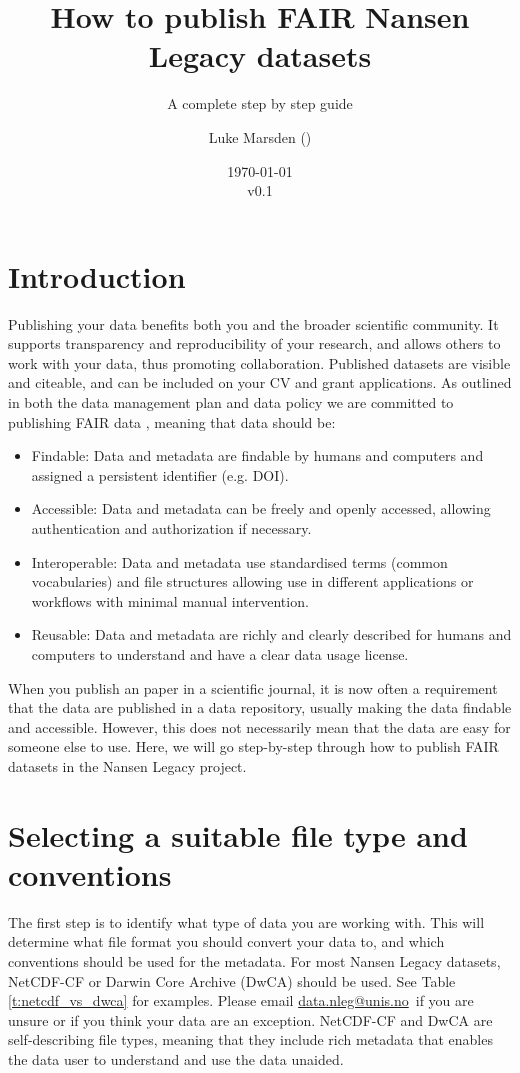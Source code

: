 \documentclass[a4paper,english, 11pt]{article}
\title{How to publish FAIR Nansen Legacy datasets}
\subtitle{A complete step by step guide}
\date{\today\\v0.1}
\author{Luke Marsden (\emailme)}
\makeatletter
\newcommand{\emailme}{\href{mailto:data.nleg@unis.no}{data.nleg@unis.no}}
\makeatother
\begin{document}
\maketitle
\tableofcontents
\pagestyle{fancy}
\newpage
\section{Introduction}
\label{s:Introduction}

Publishing your data benefits both you and the broader scientific community. It supports transparency and reproducibility of your research, and allows others to work with your data, thus promoting collaboration. Published datasets are visible and citeable, and can be included on your CV and grant applications. As outlined in both the data management plan \citep{aendmp2021} and data policy \citep{aendatapolicy2021} we are committed to publishing FAIR data \citep{wilkinson2016fair}, meaning that data should be:

\begin{itemize}
\item Findable: Data and metadata are findable by humans and computers and assigned a persistent identifier (e.g. DOI).
\item Accessible: Data and metadata can be freely and openly accessed, allowing authentication and authorization if necessary.
\item Interoperable: Data and metadata use standardised terms (common vocabularies) and file structures allowing use in different applications or workflows with minimal manual intervention. 
\item Reusable: Data and metadata are richly and clearly described for humans and computers to understand and have a clear data usage license. 
\end{itemize}

When you publish an paper in a scientific journal, it is now often a requirement that the data are published in a data repository, usually making the data findable and accessible. However, this does not necessarily mean that the data are easy for someone else to use. Here, we will go step-by-step through how to publish FAIR datasets in the Nansen Legacy project.

\section{Selecting a suitable file type and conventions}
\label{s:FileType}

The first step is to identify what type of data you are working with. This will determine what file format you should convert your data to, and which conventions should be used for the metadata. For most Nansen Legacy datasets, NetCDF-CF or Darwin Core Archive (DwCA) should be used. See Table \ref{t:netcdf_vs_dwca} for examples. Please email \emailme \ if you are unsure or if you think your data are an exception. NetCDF-CF and DwCA are self-describing file types, meaning that they include rich metadata that enables the data user to understand and use the data unaided.
\end{document}
